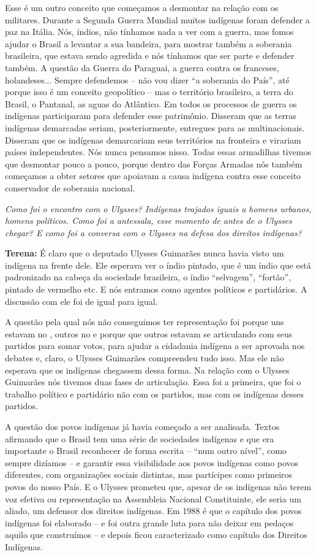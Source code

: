 Esse é um outro conceito que começamos a desmontar na relação com os
militares. Durante a Segunda Guerra Mundial muitos indígenas foram
defender a paz na Itália. Nós, índios, não tínhamos nada a ver com a
guerra, mas fomos ajudar o Brasil a levantar a sua bandeira, para
mostrar também a soberania brasileira, que estava sendo agredida e nós
tínhamos que ser parte e defender também. A questão da Guerra do
Paraguai, a guerra contra os franceses, holandeses... Sempre defendemos
-- não vou dizer ``a soberania do País'', até porque isso é um conceito
geopolítico -- mas o território brasileiro, a terra do Brasil, o
Pantanal, as aguas do Atlântico. Em todos os processos de guerra os
indígenas participaram para defender esse patrimônio. Disseram que as
terras indígenas demarcadas seriam, posteriormente, entregues para as
multinacionais. Disseram que os indígenas demarcariam seus territórios
na fronteira e virariam países independentes. Nós nunca pensamos nisso.
Todas essas armadilhas tivemos que desmontar pouco a pouco, porque
dentro das Forças Armadas nós também começamos a obter setores que
apoiavam a causa indígena contra esse conceito conservador de soberania
nacional.

\emph{Como foi o encontro com o Ulysses? Indígenas trajados iguais a
homens urbanos, homens políticos. Como foi a antessala, esse momento de
antes de o Ulysses chegar? E como foi a conversa com o Ulysses na defesa
dos direitos indígenas?}

\textbf{Terena:} É claro que o deputado Ulysses Guimarães nunca havia
visto um indígena na frente dele. Ele esperava ver o índio pintado, que
é um índio que está padronizado na cabeça da sociedade brasileira, o
índio ``selvagem'', ``fortão'', pintado de vermelho etc. E nós entramos
como agentes políticos e partidários. A discussão com ele foi de igual
para igual.

A questão pela qual nós não conseguimos ter representação foi porque uns
estavam no , outros no  e porque que outros estavam se articulando
com seus partidos para somar votos, para ajudar a cidadania indígena a
ser aprovada nos debates e, claro, o Ulysses Guimarães compreendeu tudo
isso. Mas ele não esperava que os indígenas chegassem dessa forma. Na
relação com o Ulysses Guimarães nós tivemos duas fases de articulação.
Essa foi a primeira, que foi o trabalho político e partidário não com os
partidos, mas com os indígenas desses partidos.

A questão dos povos indígenas já havia começado a ser analisada. Textos
afirmando que o Brasil tem uma série de sociedades indígenas e que era
importante o Brasil reconhecer de forma escrita -- ``num outro nível'',
como sempre dizíamos -- e garantir essa visibilidade aos povos indígenas
como povos diferentes, com organizações sociais distintas, mas
partícipes como primeiros povos do nosso País. E o Ulysses prometeu que,
apesar de os indígenas não terem voz efetiva ou representação na
Assembleia Nacional Constituinte, ele seria um aliado, um defensor dos
direitos indígenas. Em 1988 é que o capítulo dos povos indígenas foi
elaborado -- e foi outra grande luta para não deixar em pedaços aquilo
que construímos -- e depois ficou caracterizado como capítulo dos
Direitos Indígenas.

